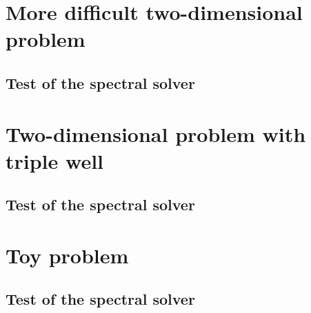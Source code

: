 \documentclass{report}
\begin{document}
        
    \newpage
    
    \section*{More difficult two-dimensional problem}
    
        
        \subsection*{Test of the spectral solver}
            
            \begin{figure}[H]
                \centering
                {\graphicspath{{../problem_2D_difficult/error_spectral/}}}
            \end{figure}
            
        
    \newpage
    
    \section*{Two-dimensional problem with triple well}
    
        
        \subsection*{Test of the spectral solver}
            
            \begin{figure}[H]
                \centering
                {\graphicspath{{../problem_triple_well/error_spectral/}}}
            \end{figure}
            
        
    \newpage
    
    \section*{Toy problem}
    
        
        \subsection*{Test of the spectral solver}
            
            \begin{figure}[H]
                \centering
                {\graphicspath{{../problem_toy/error_spectral/}}}
            \end{figure}
            
\end{document}
